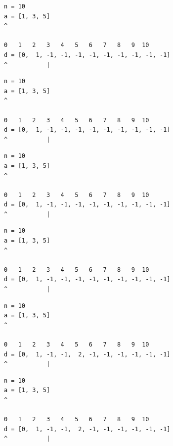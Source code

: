 \begin{frame}[fragile]
\begin{verbatim}
n = 10
a = [1, 3, 5]
^

0   1   2   3   4   5   6   7   8   9  10
d = [0,  1, -1, -1, -1, -1, -1, -1, -1, -1, -1]
^           |
\end{verbatim}
\end{frame}
\addtocounter{framenumber}{-1}

\begin{frame}[fragile]
\begin{verbatim}
n = 10
a = [1, 3, 5]
^

0   1   2   3   4   5   6   7   8   9  10
d = [0,  1, -1, -1, -1, -1, -1, -1, -1, -1, -1]
^           |
\end{verbatim}
\end{frame}
\addtocounter{framenumber}{-1}

\begin{frame}[fragile]
\begin{verbatim}
n = 10
a = [1, 3, 5]
^

0   1   2   3   4   5   6   7   8   9  10
d = [0,  1, -1, -1, -1, -1, -1, -1, -1, -1, -1]
^           |
\end{verbatim}
\end{frame}
\addtocounter{framenumber}{-1}

\begin{frame}[fragile]
\begin{verbatim}
n = 10
a = [1, 3, 5]
^

0   1   2   3   4   5   6   7   8   9  10
d = [0,  1, -1, -1, -1, -1, -1, -1, -1, -1, -1]
^           |
\end{verbatim}
\end{frame}
\addtocounter{framenumber}{-1}

\begin{frame}[fragile]
\begin{verbatim}
n = 10
a = [1, 3, 5]
^

0   1   2   3   4   5   6   7   8   9  10
d = [0,  1, -1, -1,  2, -1, -1, -1, -1, -1, -1]
^           |
\end{verbatim}
\end{frame}
\addtocounter{framenumber}{-1}

\begin{frame}[fragile]
\begin{verbatim}
n = 10
a = [1, 3, 5]
^

0   1   2   3   4   5   6   7   8   9  10
d = [0,  1, -1, -1,  2, -1, -1, -1, -1, -1, -1]
^           |
\end{verbatim}
\end{frame}
\addtocounter{framenumber}{-1}

